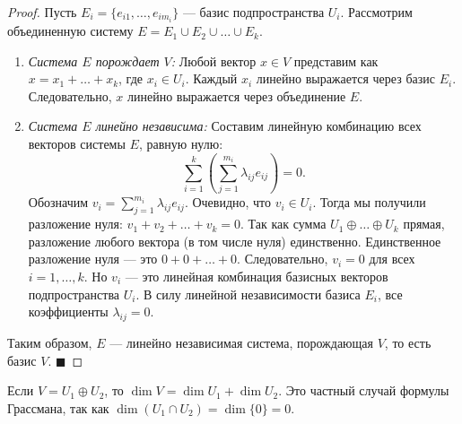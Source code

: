 \begin{proof}
Пусть $E_i = \{e_{i1}, \dots, e_{im_i}\}$ --- базис подпространства $U_i$. Рассмотрим объединенную систему $E = E_1 \cup E_2 \cup \dots \cup E_k$.
\begin{enumerate}
    \item \textit{Система $E$ порождает $V$:} Любой вектор $x \in V$ представим как $x = x_1 + \dots + x_k$, где $x_i \in U_i$. Каждый $x_i$ линейно выражается через базис $E_i$. Следовательно, $x$ линейно выражается через объединение $E$.
    \item \textit{Система $E$ линейно независима:} Составим линейную комбинацию всех векторов системы $E$, равную нулю:
    \[
    \sum_{i=1}^k \left( \sum_{j=1}^{m_i} \lambda_{ij} e_{ij} \right) = 0.
    \]
    Обозначим $v_i = \sum_{j=1}^{m_i} \lambda_{ij} e_{ij}$. Очевидно, что $v_i \in U_i$. Тогда мы получили разложение нуля: $v_1 + v_2 + \dots + v_k = 0$. 
    Так как сумма $U_1 \oplus \dots \oplus U_k$ прямая, разложение любого вектора (в том числе нуля) единственно. Единственное разложение нуля --- это $0 + 0 + \dots + 0$. Следовательно, $v_i = 0$ для всех $i = 1, \dots, k$.
    Но $v_i$ --- это линейная комбинация базисных векторов подпространства $U_i$. В силу линейной независимости базиса $E_i$, все коэффициенты $\lambda_{ij} = 0$. 
\end{enumerate}
Таким образом, $E$ --- линейно независимая система, порождающая $V$, то есть базис $V$.
\hfill$\blacksquare$
\end{proof}

\begin{corollary}
Если $V = U_1 \oplus U_2$, то $\dim V = \dim U_1 + \dim U_2$. Это частный случай формулы Грассмана, так как $\dim(U_1 \cap U_2) = \dim\{0\} = 0$.
\end{corollary}
